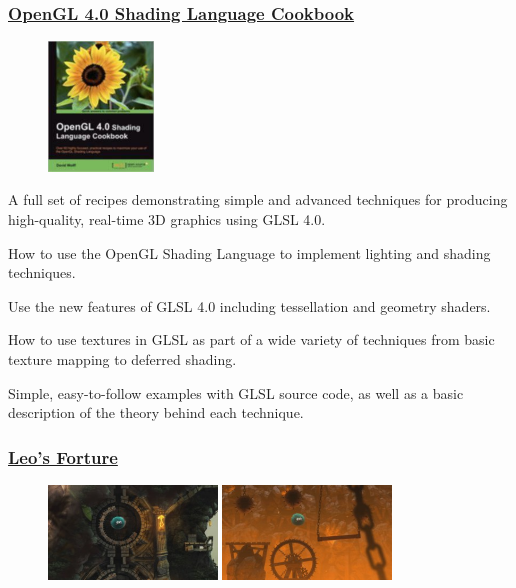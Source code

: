 \documentclass{scrartcl}
\numberwithin{figure}{subsection}
\begin{document}
\subsubsection{\href{http://www.packtpub.com/opengl-4-0-shading-language-cookbook/book?tag=rk/opengl4-abr1/0811}{OpenGL 4.0 Shading Language Cookbook}}

\begin{figure}
  \includegraphics[width=0.25\textwidth, right]{glsl4book}
\end{figure}

A full set of recipes demonstrating simple and advanced techniques for producing high-quality, real-time 3D graphics using GLSL 4.0.

How to use the OpenGL Shading Language to implement lighting and shading techniques.

Use the new features of GLSL 4.0 including tessellation and geometry shaders.

How to use textures in GLSL as part of a wide variety of techniques from basic texture mapping to deferred shading.

Simple, easy-to-follow examples with GLSL source code, as well as a basic description of the theory behind each technique.

\subsubsection{\href{http://www.leosfortune.com/}{Leo's Forture}}

\begin{figure}
  \includegraphics[width=0.4\textwidth, right]{leosfortune}
  \includegraphics[width=0.4\textwidth, right]{leosfortune2}
\end{figure}
\end{document}
